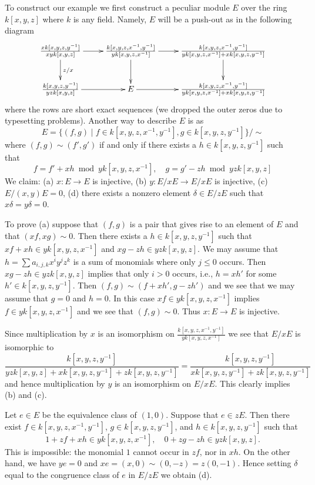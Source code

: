 \medskip\noindent
To construct our example we first
construct a peculiar module $E$ over the ring $k[x, y, z]$
where $k$ is any field. Namely, $E$ will be a push-out as
in the following diagram
$$
\xymatrix{
\frac{xk[x, y, z, y^{-1}]}{xyk[x, y, z]} \ar[r] \ar[d]^{z/x} &
\frac{k[x, y, z, x^{-1}, y^{-1}]}{yk[x, y, z, x^{-1}]} \ar[r] \ar[d] &
\frac{k[x, y, z, x^{-1}, y^{-1}]}{yk[x, y, z, x^{-1}] + xk[x, y, z, y^{-1}]}
\ar[d] \\
\frac{k[x, y, z, y^{-1}]}{yzk[x, y, z]} \ar[r] &
E \ar[r] &
\frac{k[x, y, z, x^{-1}, y^{-1}]}{yk[x, y, z, x^{-1}] + xk[x, y, z, y^{-1}]}
}
$$
where the rows are short exact sequences (we dropped the outer zeros due
to typesetting problems). Another way to describe $E$ is as
$$
E = \{(f, g) \mid f \in k[x, y, z, x^{-1}, y^{-1}],
g \in k[x, y, z, y^{-1}] \}/\sim
$$
where $(f, g) \sim (f', g')$ if and only if there exists a
$h \in k[x, y, z, y^{-1}]$ such that
$$
f = f' + xh \bmod yk[x, y, z, x^{-1}], \quad
g = g' - zh \bmod yzk[x, y, z]
$$
We claim: (a) $x : E \to E$ is injective, (b)
$y : E/xE \to E/xE$ is injective, (c) $E/(x, y)E = 0$, (d) there
exists a nonzero element $\delta \in E/zE$ such that
$x\delta = y\delta = 0$.

\medskip\noindent
To prove (a) suppose that $(f, g)$ is a pair that gives rise to an
element of $E$ and that $(xf, xg) \sim 0$. Then there exists a
$h \in k[x, y, z, y^{-1}]$ such that $xf + xh \in yk[x, y, z, x^{-1}]$
and $xg - zh \in yzk[x, y, z]$. We may assume that
$h = \sum a_{i, j, k}x^iy^jz^k$ is a sum of monomials where only
$j \leq 0$ occurs. Then $xg - zh \in yzk[x, y, z]$ implies that
only $i > 0$ occurs, i.e., $h = xh'$ for some $h' \in k[x, y, z, y^{-1}]$.
Then $(f, g) \sim (f + xh', g - zh')$ and we see that we may assume
that $g = 0$ and $h = 0$. In this case $xf \in yk[x, y, z, x^{-1}]$
implies $f \in yk[x, y, z, x^{-1}]$ and we see that $(f, g) \sim 0$.
Thus $x : E \to E$ is injective.

\medskip\noindent
Since multiplication by $x$ is an isomorphism on
$\frac{k[x, y, z, x^{-1}, y^{-1}]}{yk[x, y, z, x^{-1}]}$ we see that
$E/xE$ is isomorphic to
$$
\frac{k[x, y, z, y^{-1}]}{
yzk[x, y, z] + xk[x, y, z, y^{-1}] + zk[x, y, z, y^{-1}]}
=
\frac{k[x, y, z, y^{-1}]}{xk[x, y, z, y^{-1}] + zk[x, y, z, y^{-1}]}
$$
and hence multiplication by $y$ is an isomorphism on $E/xE$. This clearly
implies (b) and (c).

\medskip\noindent
Let $e \in E$ be the equivalence class of $(1, 0)$.
Suppose that $e \in zE$. Then there exist $f \in k[x, y, z, x^{-1}, y^{-1}]$,
$g \in k[x, y, z, y^{-1}]$, and $h \in k[x, y, z, y^{-1}]$ such that
$$
1 + zf + xh \in yk[x, y, z, x^{-1}], \quad
0 + zg - zh \in yzk[x, y, z].
$$
This is impossible: the monomial $1$ cannot occur in
$zf$, nor in $xh$. On the other hand, we have $ye = 0$ and
$xe = (x, 0) \sim (0, -z) = z(0, -1)$. Hence setting $\delta$
equal to the congruence class of $e$ in $E/zE$ we obtain (d).

